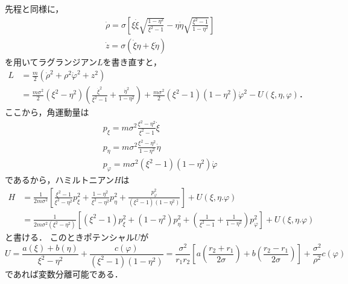 \documentclass[a4paper,12pt]{jsarticle}
\begin{document}
	先程と同様に，
	\begin{align}
	&\dot{\rho}  = \sigma
	\left[ \xi \dot{\xi} \sqrt{\frac{1-\eta^2}{\xi^2-1}}
	- \eta \dot{\eta} \sqrt{\frac{\xi^2-1}{1-\eta^2}} \right] \\
	&\dot{z} = \sigma \left( \dot{\xi} \eta + \xi \dot{\eta} \right)
	\end{align}
	を用いてラグランジアン$L$を書き直すと，
	\begin{align}
	L &= \frac{m}{2} \left( \dot{\rho}^2 + \rho^2 \dot{\varphi}^2 + z^2 \right) \\
	&= \frac{m\sigma^2}{2} \left( \xi^2 - \eta^2 \right)
	\left( \frac{\dot{\xi}^2}{\xi^2 - 1} + \frac{\dot{\eta}^2}{1 - \eta^2} \right)
	+ \frac{m\sigma^2}{2}
	\left( \xi^2 - 1 \right) \left( 1 - \eta^2 \right)\dot{\varphi}^2
	- U(\xi, \eta, \varphi) \mbox{．}
	\end{align}
	ここから，角運動量は
	\begin{align}
	&p_{\xi} = m\sigma^2 \frac{\xi^2 - \eta^2}{\xi^2 - 1} \dot{\xi} \\
	&p_{\eta} = m \sigma^2 \frac{\xi^2 - \eta^2}{1 - \eta^2} \dot{\eta} \\
	&p_{\varphi} =
	m \sigma^2 \left( \xi^2 - 1 \right) \left( 1 - \eta^2 \right) \dot{\varphi}
	\end{align}
	であるから，ハミルトニアン$H$は
	\begin{align}
	H &= \frac{1}{2m \sigma^2} \left[ \frac{\xi^2 - 1}{\xi^2 - \eta^2} p_{\xi}^2
	+ \frac{1 - \eta^2}{\xi^2 - \eta^2} p_{\eta}^2
	+ \frac{p_{\varphi}^2}
	{\left( \xi^2 - 1 \right) \left( 1 - \eta^2 \right)} \right]
	+ U(\xi, \eta. \varphi) \\
	&= \frac{1}{2m \sigma^2 \left( \xi^2 - \eta^2 \right)} \left[
	\left( \xi^2 - 1 \right) p_{\xi}^2 + \left( 1 - \eta^2 \right) p_{\eta}^2
	+ \left(\frac{1}{\xi^2 - 1} + \frac{1}{1 - \eta^2}\right) p_{\varphi}^2 \right]
	+ U(\xi, \eta. \varphi)
	\end{align}
	と書ける．
	このときポテンシャル$U$が
	\begin{equation}
	U = \frac{a(\xi) + b(\eta)}{\xi^2 - \eta^2}
	+ \frac{c(\varphi)}{\left( \xi^2 - 1 \right)\left( 1 - \eta^2 \right)}
	= \frac{\sigma^2}{r_1 r_2}
	\left[ a \left( \frac{r_2 + r_1}{2\sigma} \right)
	+ b \left( \frac{r_2 - r_1}{2\sigma} \right) \right]
	+ \frac{\sigma^2}{\rho^2} c(\varphi)
	\end{equation}
	であれば変数分離可能である．
	
\end{document}
